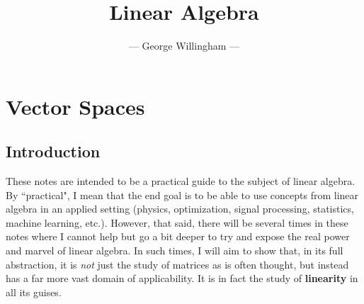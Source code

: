 \documentclass[onecolumn]{gwclass}
\title{\vspace{2in}\Huge\textbf{Linear Algebra}}
\author{--- George Willingham ---}
\date{}
\begin{document}
	

\maketitle

\newpage
\tableofcontents


\newpage
\section{Vector Spaces}
\subsection{Introduction}

These notes are intended to be a practical guide to the subject of linear algebra. By ``practical", I mean that the end goal is to be able to use concepts from linear algebra in an applied setting (physics, optimization, signal processing, statistics, machine learning, etc.). However, that said, there will be several times in these notes where I cannot help but go a bit deeper to try and expose the real power and marvel of linear algebra. In such times, I will aim to show that, in its full abstraction, it is \emph{not} just the study of matrices as is often thought, but instead has a far more vast domain of applicability. It is in fact the study of \textbf{linearity} in all its guises.
 
\end{document}
